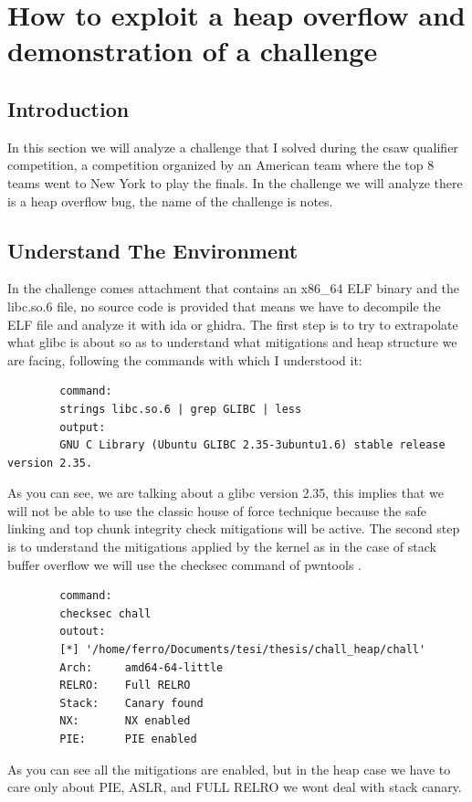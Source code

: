 \documentclass{report}
\begin{document}
        
    \section{How to exploit a heap overflow and demonstration of a challenge}
    \subsection{Introduction}
    In this section we will analyze a challenge that I solved during the csaw qualifier competition, a competition organized by an American team where the top 8 teams went to New York to play the finals.\newline
    In the challenge we will analyze there is a heap overflow bug, the name of the challenge is notes. \newline
    \subsection{Understand The Environment}
    In the challenge comes attachment that contains an x86\_64 ELF binary and the libc.so.6 file, no source code is provided that means we have to decompile the ELF file and analyze it with ida or ghidra.\newline
    The first step is to try to extrapolate what glibc is about so as to understand what mitigations and heap structure we are facing, following the commands with which I understood it:
    \begin{verbatim}
        command:
        strings libc.so.6 | grep GLIBC | less
        output:
        GNU C Library (Ubuntu GLIBC 2.35-3ubuntu1.6) stable release version 2.35.
    \end{verbatim}
    As you can see, we are talking about a glibc version 2.35, this implies that we will not be able to use the classic house of force technique because the safe linking and top chunk integrity check mitigations will be active.\newline
    The second step is to understand the mitigations applied by the kernel as in the case of stack buffer overflow we will use the checksec command of pwntools   .\newline
    \begin{verbatim}
        command:
        checksec chall
        outout:
        [*] '/home/ferro/Documents/tesi/thesis/chall_heap/chall'
        Arch:     amd64-64-little
        RELRO:    Full RELRO
        Stack:    Canary found
        NX:       NX enabled
        PIE:      PIE enabled
    \end{verbatim}
    As you can see all the mitigations are enabled, but in the heap case we have to care only about PIE, ASLR, and FULL RELRO we wont deal with stack canary.
\end{document}
